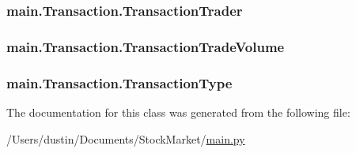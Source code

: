 \subsubsection[{Transaction\+Trader}]{\setlength{\rightskip}{0pt plus 5cm}main.\+Transaction.\+Transaction\+Trader}\label{classmain_1_1_transaction_a72c003d322f6d0d3ed5da4dcbcab72e7}
\hypertarget{classmain_1_1_transaction_aa02d22f0712facfcee226da493037be2}{}
\subsubsection[{Transaction\+Trade\+Volume}]{\setlength{\rightskip}{0pt plus 5cm}main.\+Transaction.\+Transaction\+Trade\+Volume}\label{classmain_1_1_transaction_aa02d22f0712facfcee226da493037be2}
\hypertarget{classmain_1_1_transaction_a689eae0972a251bc871a00dc4baad575}{}
\subsubsection[{Transaction\+Type}]{\setlength{\rightskip}{0pt plus 5cm}main.\+Transaction.\+Transaction\+Type}\label{classmain_1_1_transaction_a689eae0972a251bc871a00dc4baad575}


The documentation for this class was generated from the following file\+:\begin{DoxyCompactItemize}
\item 
/\+Users/dustin/\+Documents/\+Stock\+Market/\hyperlink{main_8py}{main.\+py}\end{DoxyCompactItemize}
